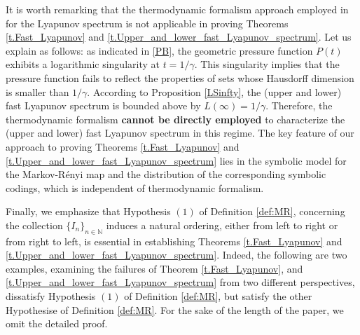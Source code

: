 \documentclass[12pt,reqno]{amsart}
\renewcommand{\=}{\coloneqq}
\theoremstyle{plain}
\begin{document}
It is worth remarking that the thermodynamic formalism approach employed in \cite{Iommi} for the Lyapunov spectrum is not applicable in proving Theorems \ref{t.Fast_Lyapunov} and \ref{t.Upper_and_lower_fast_Lyapunov_spectrum}. Let us explain as follows: as indicated in \eqref{PB}, the geometric pressure function $P(t)$ exhibits a logarithmic singularity at $t=1/\gamma$. This singularity implies that the pressure function fails to reflect the properties of sets whose Hausdorff dimension is smaller than $1/\gamma$. According to Proposition \ref{LSinfty}, the (upper and lower) fast Lyapunov spectrum is bounded above by $L(\infty)=1/\gamma$. Therefore, the thermodynamic formalism \textbf{cannot be directly employed} to characterize the (upper and lower) fast Lyapunov spectrum in this regime. The key feature of our approach to proving Theorems \ref{t.Fast_Lyapunov} and \ref{t.Upper_and_lower_fast_Lyapunov_spectrum} lies in the symbolic model for the Markov-R\'{e}nyi map and the distribution of the corresponding symbolic codings, which is independent of thermodynamic formalism.


Finally, we emphasize that Hypothesis $(1)$ of Definition \ref{def:MR}, concerning the collection $\{I_n\}_{n\in \mathbb N}$ induces a natural ordering, either from left to right or from right to left, is essential in establishing Theorems \ref{t.Fast_Lyapunov} and \ref{t.Upper_and_lower_fast_Lyapunov_spectrum}. Indeed, the following are two examples, examining the failures of Theorem \ref{t.Fast_Lyapunov}, and \ref{t.Upper_and_lower_fast_Lyapunov_spectrum} from two different perspectives, dissatisfy Hypothesis $(1)$ of Definition \ref{def:MR}, but satisfy the other Hypothesise of Definition \ref{def:MR}. For the sake of the length of the paper, we omit the detailed proof.
\end{document}
